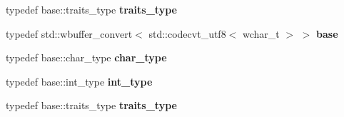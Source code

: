 \begin{DoxyCompactItemize}
typedef base\+::traits\+\_\+type {\bfseries traits\+\_\+type}
\item 
\mbox{\label{structtest__buf_a46442a28d5ada8ecd95002e4ef84cad4}} 
typedef std\+::wbuffer\+\_\+convert$<$ std\+::codecvt\+\_\+utf8$<$ wchar\+\_\+t $>$ $>$ {\bfseries base}
\item 
\mbox{\label{structtest__buf_ad9efd221a65faf6eabbd82c50c72f7f1}} 
typedef base\+::char\+\_\+type {\bfseries char\+\_\+type}
\item 
\mbox{\label{structtest__buf_a824d143321ad5e6d087d55c59a7a9ea6}} 
typedef base\+::int\+\_\+type {\bfseries int\+\_\+type}
\item 
\mbox{\label{structtest__buf_ad2ec103e3e5c69ece4b70dc12c83b1ce}} 
typedef base\+::traits\+\_\+type {\bfseries traits\+\_\+type}
\end{DoxyCompactItemize}
